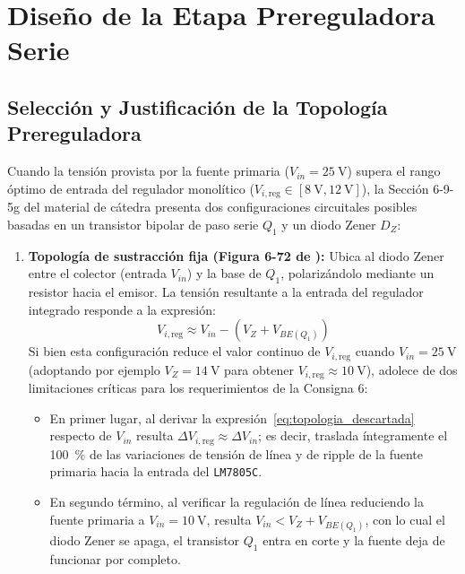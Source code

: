 \section{Diseño de la Etapa Prereguladora Serie}

\subsection{Selección y Justificación de la Topología Prereguladora}
Cuando la tensión provista por la fuente primaria ($V_{in} = \SI{25}{\volt}$) supera el rango óptimo de entrada del regulador monolítico ($V_{i,\text{reg}} \in [\SI{8}{\volt}, \SI{12}{\volt}]$), la Sección 6-9-5g del material de cátedra \cite{gonzalez_p3} presenta dos configuraciones circuitales posibles basadas en un transistor bipolar de paso serie $Q_1$ y un diodo Zener $D_Z$:
\begin{enumerate}
    \item \textbf{Topología de sustracción fija (Figura 6-72 de \cite{gonzalez_p3}):} Ubica al diodo Zener entre el colector (entrada $V_{in}$) y la base de $Q_1$, polarizándolo mediante un resistor hacia el emisor. La tensión resultante a la entrada del regulador integrado responde a la expresión:
    \begin{equation}
        V_{i,\text{reg}} \approx V_{in} - \left( V_Z + V_{BE(Q_1)} \right)
        \label{eq:topologia_descartada}
    \end{equation}
    Si bien esta configuración reduce el valor continuo de $V_{i,\text{reg}}$ cuando $V_{in} = \SI{25}{\volt}$ (adoptando por ejemplo $V_Z = \SI{14}{\volt}$ para obtener $V_{i,\text{reg}} \approx \SI{10}{\volt}$), adolece de dos limitaciones críticas para los requerimientos de la Consigna 6:
    \begin{itemize}
        \item En primer lugar, al derivar la expresión~\eqref{eq:topologia_descartada} respecto de $V_{in}$ resulta $\Delta V_{i,\text{reg}} \approx \Delta V_{in}$; es decir, traslada íntegramente el \SI{100}{\percent} de las variaciones de tensión de línea y de ripple de la fuente primaria hacia la entrada del \texttt{LM7805C}.
        \item En segundo término, al verificar la regulación de línea reduciendo la fuente primaria a $V_{in} = \SI{10}{\volt}$, resulta $V_{in} < V_Z + V_{BE(Q_1)}$, con lo cual el diodo Zener se apaga, el transistor $Q_1$ entra en corte y la fuente deja de funcionar por completo.
    \end{itemize}


\end{enumerate}
